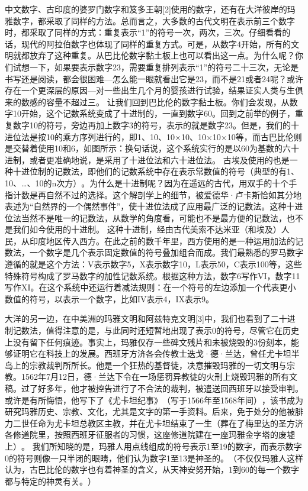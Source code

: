 中文数字、古印度的婆罗门数字和笈多王朝[2]使用的数字，还有在大洋彼岸的玛雅数字，都采取了同样的方法。总而言之，大多数的古代文明在表示前三个数字时，都采取了同样的方式：重复表示“1”的符号一次，两次，三次。仔细看看的话，现代的阿拉伯数字也体现了同样的重复方式。可是，从数字4开始，所有的文明就都放弃了这种重复。从巴比伦数字黏土板上也可以看出这一点。为什么呢？你们试想一下，如果要表示数字23，需要重复排列表示“1”的符号二十三次，无论是书写还是阅读，都会很困难---怎么能一眼就看出它是23，而不是21或者24呢？或许存在一个更深层的原因---对一些出生几个月的婴孩进行试验，结果证实人类与生俱来的数感的容量不超过三。
让我们回到巴比伦的数字黏土板。你们会发现，从数字10开始，这个记数系统变成了十进制的，一直到数字60。回到之前举的例子，重复数字10的符号，旁边再加上数字3的符号，表示的就是数字23。但是，我们的十进位法是按10的乘方序列进行的，即1、10、10×10、10×10×10等，而古巴比伦则是交替着使用10和6，如图所示：换句话说，这个系统实行的是以60为基数的六十进制，或者更准确地说，是采用了十进位法和六十进位法。
古埃及使用的也是一种十进位制的记数法，即他们的记数系统中存在表示常数值的符号（典型的有1、10、…、10的n次方）​。为什么是十进制呢？因为在遥远的古代，用双手的十个手指计数是再自然不过的选择。这个解剖学上的细节，被爱德华·卢卡斯恰如其分地表述为“自然界的一个偶然事件”​，使十进位法成了应用最广泛的记数法。这种十进位法当然不是唯一的记数法，从数学的角度看，可能也不是最方便的记数法，也不是我们如今使用的十进制。
这种十进制，经由古代美索不达米亚（和埃及）人民，从印度地区传入西方。在此之前的数千年里，西方使用的是一种运用加法的记数法，一个数字是几个表示固定数值的符号叠加组合而成。我们最熟悉的罗马数字遵循的就是这个方法：V表示数字5，X表示数字10，L表示50，C表示100等，这些特殊符号构成了罗马数字的加性记数系统。根据这种方法，数字6写作VI，数字11写作XI。在这个系统中还运行着减法规则：在一个符号的左边添加一个代表更小数值的符号，以表示一个数字，比如IV表示4，IX表示9。


大洋的另一边，在中美洲的玛雅文明和阿兹特克文明[3]中，我们也看到了二十进制记数法，值得注意的是，与此同时还短暂地出现了表示0的符号，尽管它在历史上没有留下任何痕迹。事实上，玛雅仅存一些碑文残片和未被烧毁的3份刻本，能够证明它在科技上的发展。西班牙方济各会传教士迭戈·德·兰达，曾任尤卡坦半岛上的宗教裁判所所长。他是一个狂热的基督徒，决意摧毁玛雅的一切文明与宗教。1562年7月12日，德·兰达下令在一场惩罚异教徒的火刑上烧毁玛雅的所有文稿。过了好多年，他才被控告进行了不合法的裁判，被遣送回西班牙以接受审判。或许是有所悔悟，他写下了《尤卡坦纪事》​（写于1566年至1568年间）​，该书成为研究玛雅历史、宗教、文化，尤其是文字的第一手资料。后来，免于处分的他被腓力二世任命为尤卡坦总教区主教，并在尤卡坦结束了一生（葬在了梅里达的圣方济各修道院里，按照西班牙征服者的习惯，这座修道院建在一座玛雅金字塔的废墟上）​。
我们所知晓的是，玛雅人用点线组成的符号表示1至19的数字，而表示数字0的符号则像一只半闭的眼睛，他们认为数字1至13是神圣的。​（不仅仅玛雅人这样认为，古巴比伦的数字也有着神圣的含义，从天神安努开始，1到60的每一个数字都与特定的神灵有关。​）

